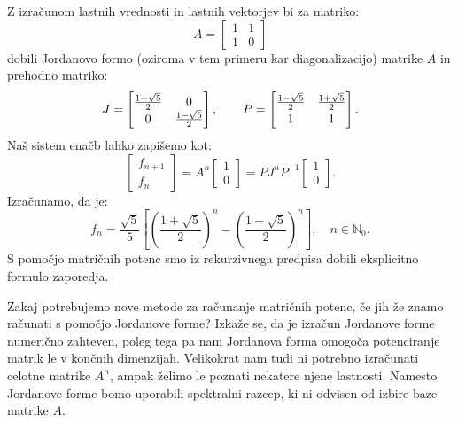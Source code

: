 \documentclass[mat1]{fmfdelo}
\newcommand{\N}{\mathbb N}
\begin{document}
\begin{zgled} 
    Z izračunom lastnih vrednosti in lastnih vektorjev bi za matriko:
    \begin{equation*}
        A = 
        \begin{bmatrix}
            1 & 1 \\
            1 & 0
        \end{bmatrix}
    \end{equation*}
    dobili Jordanovo formo (oziroma v tem primeru kar diagonalizacijo) matrike $A$ in prehodno matriko:
    \begin{equation*}
        J = 
        \begin{bmatrix}
                \frac{1+\sqrt{5}}{2} & 0 \\
            0 &  \frac{1-\sqrt{5}}{2}
        \end{bmatrix}
        ,\quad \quad
        P = 
        \begin{bmatrix}
            \frac{1-\sqrt{5}}{2} &  \frac{1+\sqrt{5}}{2} \vspace{2pt} \\
            1 & 1
        \end{bmatrix}.
    \end{equation*}
    Naš sistem enačb lahko zapišemo kot:
    \begin{equation*}
        \begin{bmatrix}
            f_{n+1} \\
            f_n
        \end{bmatrix}
        =
        A^n
        \begin{bmatrix}
            1 \\
            0
        \end{bmatrix}
        = PJ^n P^{-1}
        \begin{bmatrix}
            1 \\
            0
        \end{bmatrix}.
    \end{equation*}
    Izračunamo, da je:
    \begin{equation*}
        f_n = \frac{\sqrt{5}}{5}\left[ \left(\frac{1+\sqrt{5}}{2}\right)^n - \left(\frac{1-\sqrt{5}}{2}\right)^n \right], \quad n \in \N_0.
    \end{equation*}
    S pomočjo matričnih potenc smo iz rekurzivnega predpisa dobili eksplicitno formulo zaporedja.
\end{zgled}

Zakaj potrebujemo nove metode za računanje matričnih potenc, če jih že znamo računati s pomočjo Jordanove forme? Izkaže se, da je izračun Jordanove forme numerično zahteven, poleg tega pa nam Jordanova forma omogoča potenciranje matrik le v končnih dimenzijah. Velikokrat nam tudi ni potrebno izračunati celotne matrike $A^n$, ampak želimo le poznati nekatere njene lastnosti. Namesto Jordanove forme bomo uporabili spektralni razcep, ki ni odvisen od izbire baze matrike $A$.
\end{document}
